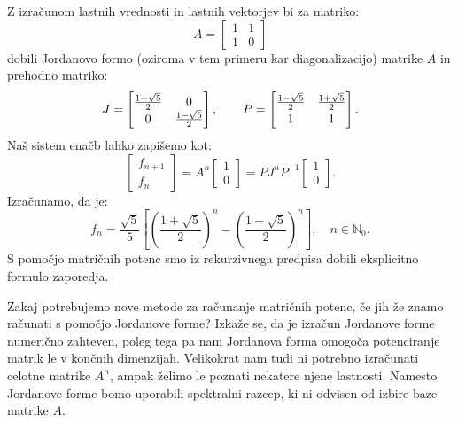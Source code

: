 \documentclass[mat1]{fmfdelo}
\newcommand{\N}{\mathbb N}
\begin{document}
\begin{zgled} 
    Z izračunom lastnih vrednosti in lastnih vektorjev bi za matriko:
    \begin{equation*}
        A = 
        \begin{bmatrix}
            1 & 1 \\
            1 & 0
        \end{bmatrix}
    \end{equation*}
    dobili Jordanovo formo (oziroma v tem primeru kar diagonalizacijo) matrike $A$ in prehodno matriko:
    \begin{equation*}
        J = 
        \begin{bmatrix}
                \frac{1+\sqrt{5}}{2} & 0 \\
            0 &  \frac{1-\sqrt{5}}{2}
        \end{bmatrix}
        ,\quad \quad
        P = 
        \begin{bmatrix}
            \frac{1-\sqrt{5}}{2} &  \frac{1+\sqrt{5}}{2} \vspace{2pt} \\
            1 & 1
        \end{bmatrix}.
    \end{equation*}
    Naš sistem enačb lahko zapišemo kot:
    \begin{equation*}
        \begin{bmatrix}
            f_{n+1} \\
            f_n
        \end{bmatrix}
        =
        A^n
        \begin{bmatrix}
            1 \\
            0
        \end{bmatrix}
        = PJ^n P^{-1}
        \begin{bmatrix}
            1 \\
            0
        \end{bmatrix}.
    \end{equation*}
    Izračunamo, da je:
    \begin{equation*}
        f_n = \frac{\sqrt{5}}{5}\left[ \left(\frac{1+\sqrt{5}}{2}\right)^n - \left(\frac{1-\sqrt{5}}{2}\right)^n \right], \quad n \in \N_0.
    \end{equation*}
    S pomočjo matričnih potenc smo iz rekurzivnega predpisa dobili eksplicitno formulo zaporedja.
\end{zgled}

Zakaj potrebujemo nove metode za računanje matričnih potenc, če jih že znamo računati s pomočjo Jordanove forme? Izkaže se, da je izračun Jordanove forme numerično zahteven, poleg tega pa nam Jordanova forma omogoča potenciranje matrik le v končnih dimenzijah. Velikokrat nam tudi ni potrebno izračunati celotne matrike $A^n$, ampak želimo le poznati nekatere njene lastnosti. Namesto Jordanove forme bomo uporabili spektralni razcep, ki ni odvisen od izbire baze matrike $A$.
\end{document}
